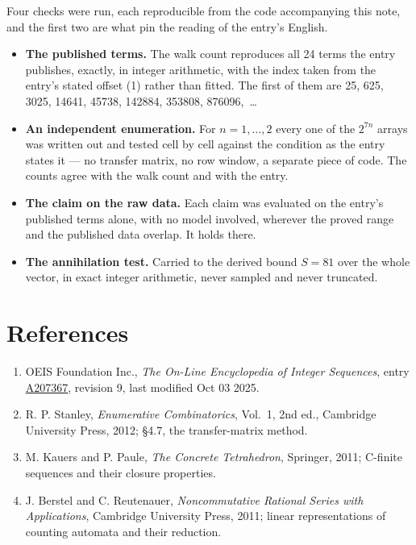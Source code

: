 \documentclass[11pt]{article}
\theoremstyle{definition}
\begin{document}
Four checks were run, each reproducible from the code accompanying this note, and the first two are what pin the reading of the entry's English.

\begin{itemize}

\item {\bfseries The published terms.} The walk count reproduces all 24 terms the entry publishes, exactly, in integer arithmetic, with the index taken from the entry's stated offset (1) rather than fitted. The first of them are 25, 625, 3025, 14641, 45738, 142884, 353808, 876096,~\dots

\item {\bfseries An independent enumeration.} For $n = 1,\dots,2$ every one of the $2^{7n}$ arrays was written out and tested cell by cell against the condition as the entry states it --- no transfer matrix, no row window, a separate piece of code. The counts agree with the walk count and with the entry.

\item {\bfseries The claim on the raw data.} Each claim was evaluated on the entry's published terms alone, with no model involved, wherever the proved range and the published data overlap. It holds there.

\item {\bfseries The annihilation test.} Carried to the derived bound $S = 81$ over the whole vector, in exact integer arithmetic, never sampled and never truncated.

\end{itemize}

\section{References}

\begin{enumerate}

\item OEIS Foundation Inc., \emph{The On-Line Encyclopedia of Integer Sequences}, entry \href{https://oeis.org/A207367}{A207367}, revision 9, last modified Oct 03 2025.

\item R. P. Stanley, \emph{Enumerative Combinatorics}, Vol.~1, 2nd ed., Cambridge University Press, 2012; \S4.7, the transfer-matrix method.

\item M. Kauers and P. Paule, \emph{The Concrete Tetrahedron}, Springer, 2011; C-finite sequences and their closure properties.

\item J. Berstel and C. Reutenauer, \emph{Noncommutative Rational Series with Applications}, Cambridge University Press, 2011; linear representations of counting automata and their reduction.

\end{enumerate}
\end{document}
